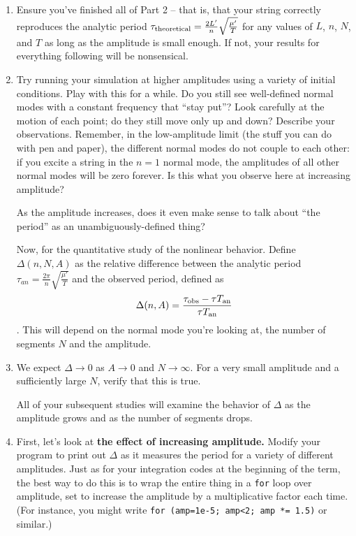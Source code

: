 \documentclass[12pt]{article}
\begin{document}
\begin{enumerate}

\item Ensure you've finished all of Part 2 -- that is, that your string correctly reproduces the analytic period $\tau_{\rm theoretical} = \frac{2L'}{n} \sqrt{\frac{\mu'}{T}}$ for any values of $L$, $n$, $N$, and $T$ as long as the amplitude is small enough. If not, your results for everything following will be nonsensical.

\item Try running your simulation at higher amplitudes using a variety of initial conditions. Play with this for a while. 
Do you still see well-defined normal modes with a constant frequency that ``stay put''? Look carefully at the motion of each point; do they still move only up and down? Describe your observations.
Remember, in the low-amplitude limit (the stuff you can do with pen and paper), the different normal modes do not couple to each other: if you excite a string in the $n=1$ normal mode, 
the amplitudes of all other normal modes will be zero forever. Is this what you observe here at increasing amplitude? 

As the amplitude increases, does it even make sense to talk about ``the period'' as an unambiguously-defined thing?

Now, for the quantitative study of the nonlinear behavior. Define $\Delta(n,N,A)$ as the relative difference between the analytic period $\tau_{an} = \frac{2\pi}{n}\sqrt{\frac{\mu'}{T}}$ and the observed period, defined as $$\Delta(n,A) = \frac{\tau_{\rm {obs}}-\tau T_{\rm{an}}}{\tau T_{\rm{an}}}$$. This will depend on the normal mode you're looking at, the number of segments $N$ and the amplitude. 

\item We expect $\Delta \rightarrow 0$ as $A \rightarrow 0$ and $N \rightarrow \infty$. For a very small amplitude and a sufficiently large $N$, verify that this is true.

All of your subsequent studies will examine the behavior of $\Delta$ as the amplitude grows and as the number of segments drops.



\item First, let's look at {\bf the effect of increasing amplitude.} Modify your program to print out $\Delta$ as it measures the period for a variety of different amplitudes. Just as for your integration codes at the beginning of the term, the best
way to do this is to wrap the entire thing in a {\tt for} loop over amplitude, set to increase the amplitude by a multiplicative factor each time. (For instance, you might write
{\tt for (amp=1e-5; amp<2; amp *= 1.5)} or similar.) 


\end{enumerate}
\end{document}
